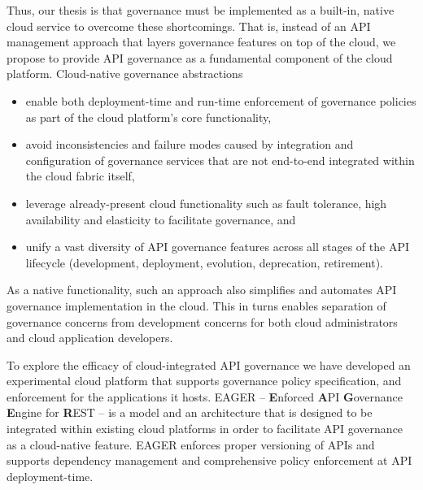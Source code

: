 Thus, our thesis is that governance must be implemented as a built-in, native
cloud service to overcome these shortcomings.
That is, instead of an API management
approach that layers governance features on top of the cloud, 
we propose to provide API governance as a fundamental component of the cloud
platform.  Cloud-native governance abstractions
\begin{itemize}
\item enable both deployment-time and run-time enforcement of governance
policies as part of the cloud platform's core functionality,
\item avoid inconsistencies and failure modes caused  
by integration and configuration of governance services that are not
end-to-end integrated within the cloud fabric itself, 
\item leverage already-present cloud functionality such as fault tolerance,
high availability and elasticity to facilitate governance, and
\item unify a vast diversity of API
governance features across all stages of the API lifecycle
(development, deployment, evolution, deprecation, retirement). 
\end{itemize}
As a native functionality, such an
approach also simplifies and automates API governance implementation in the cloud.
This in turns enables separation of governance concerns from development concerns
for both cloud administrators and cloud application developers.

To explore the efficacy of cloud-integrated API governance we have developed
an experimental cloud platform that supports governance policy specification,
and enforcement for the applications it hosts. 
EAGER -- {\bf E}nforced {\bf A}PI {\bf G}overnance
{\bf E}ngine for {\bf R}EST -- is a model and an architecture that is designed
to be integrated within existing
cloud platforms in order to facilitate API governance as a 
cloud-native feature. EAGER enforces proper versioning of APIs and supports dependency 
management and comprehensive policy enforcement at API deployment-time. 

